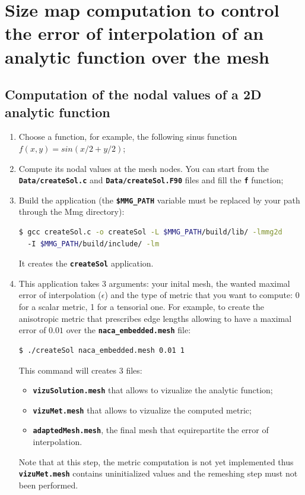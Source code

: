 \documentclass{article}
\newcommand{\ttb}[1]{\texttt{\textbf{#1}}}
\begin{document}
\section{Size map computation to control the error of interpolation of an
  analytic function over the mesh}
\subsection{Computation of the nodal values of a 2D analytic function}
\begin{enumerate}
\item Choose a function, for example, the following sinus function
  $f(x,y) = sin(x/2+y/2)$;
\item Compute its nodal values at the mesh nodes. You can start from
  the \ttb{Data/createSol.c} and \ttb{Data/createSol.F90} files and
  fill the \ttb{f} function;
\item Build the application (the \ttb{\$MMG\_PATH} variable must be
  replaced by your path through the Mmg directory):
\begin{lstlisting}[language=bash]
$ gcc createSol.c -o createSol -L $MMG_PATH/build/lib/ -lmmg2d
  -I $MMG_PATH/build/include/ -lm
\end{lstlisting}
It creates the \ttb{createSol} application.
\item This application takes 3 arguments: your inital mesh, the wanted
  maximal error of interpolation ($\epsilon$) and the type of metric
  that you want to compute: 0 for a scalar metric, 1 for a tensorial
  one. For example, to create the anisotropic metric that prescribes
  edge lengths allowing to have a maximal error of $0.01$ over the
  \ttb{naca\_embedded.mesh} file:
\begin{lstlisting}[language=bash]
  $ ./createSol naca_embedded.mesh 0.01 1
\end{lstlisting}
This command will creates 3 files:
\begin{itemize}
\item \ttb{vizuSolution.mesh} that allows to vizualize the analytic function;
\item \ttb{vizuMet.mesh} that allows to vizualize the computed metric;
\item \ttb{adaptedMesh.mesh}, the final mesh that equirepartite the
  error of interpolation.
\end{itemize}
Note that at this step, the metric computation is not yet implemented
thus \ttb{vizuMet.mesh} contains uninitialized values and the
remeshing step must not been performed.

\end{enumerate}
\end{document}
